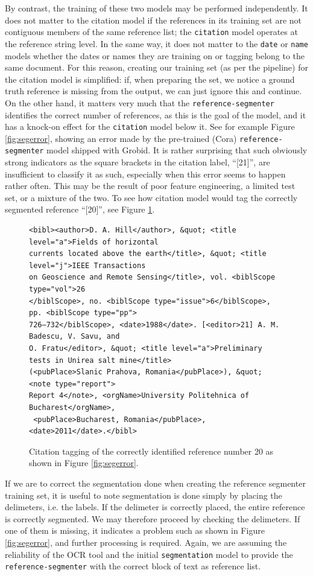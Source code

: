 \documentclass[11pt, oneside]{scrartcl}   	%
\begin{document}
By contrast, the training of these two models may be performed independently. It does not matter to the citation model if the references in its training set are not contiguous members of the same reference list; the \texttt{citation} model operates at the reference string level. In the same way, it does not matter to the \texttt{date} or \texttt{name} models whether the dates or names they are training on or tagging belong to the same document. For this reason, creating our training set (as per the pipeline) for the citation model is simplified: if, when preparing the set, we notice a ground truth reference is missing from the output, we can just ignore this and continue. On the other hand, it matters very much that the \texttt{reference-segmenter} identifies the correct number of references, as this is the goal of the model, and it has a knock-on effect for the \texttt{citation} model below it. See for example Figure \ref{fig:segerror}, showing an error made by the pre-trained (Cora) \texttt{reference-segmenter} model shipped with Grobid.  It is rather surprising that such obviously strong indicators as the square brackets in the citation label, ``[21]'', are insufficient to classify it as such, especially when this error seems to happen rather often. This may be the result of poor feature engineering, a limited test set, or a mixture of the two. To see how citation model would tag the correctly segmented reference ``[20]'', see Figure \ref{fig:citsample}.

\begin{figure}
\begin{verbatim}
<bibl><author>D. A. Hill</author>, &quot; <title level="a">Fields of horizontal 
currents located above the earth</title>, &quot; <title level="j">IEEE Transactions
on Geoscience and Remote Sensing</title>, vol. <biblScope type="vol">26
</biblScope>, no. <biblScope type="issue">6</biblScope>, pp. <biblScope type="pp">
726–732</biblScope>, <date>1988</date>. [<editor>21] A. M. Badescu, V. Savu, and
O. Fratu</editor>, &quot; <title level="a">Preliminary tests in Unirea salt mine</title>
(<pubPlace>Slanic Prahova, Romania</pubPlace>), &quot; <note type="report">
Report 4</note>, <orgName>University Politehnica of Bucharest</orgName>,
 <pubPlace>Bucharest, Romania</pubPlace>, <date>2011</date>.</bibl>
\end{verbatim}
\caption{Citation tagging of the correctly identified reference number 20 as shown in Figure \ref{fig:segerror}.}
\label{fig:citsample}
\end{figure}

If we are to correct the segmentation done when creating the reference segmenter training set, it is useful to note segmentation is done simply by placing the delimeters, i.e. the labels. If the delimeter is correctly placed, the entire reference is correctly segmented. We may therefore proceed by checking the delimeters. If one of them is missing, it indicates a problem such as shown in Figure \ref{fig:segerror}, and further processing is required. Again, we are assuming the reliability of the OCR tool and the initial \texttt{segmentation} model to provide the \texttt{reference-segmenter} with the correct block of text as reference list.
\end{document}
